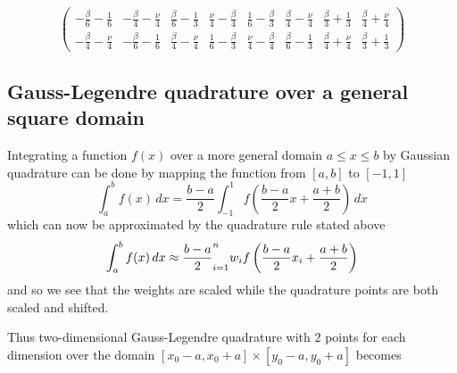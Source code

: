 \documentclass[11pt]{article}
\let\sumop\relax
\begin{document}
\begin{equation}
\begin{pmatrix}
	- \frac{\beta}{6} - \frac{1}{6} & - \frac{\beta}{4} - \frac{\nu}{4} & \frac{\beta}{6} - \frac{1}{3} &   \frac{\nu}{4} - \frac{\beta}{4} & \frac{1}{6} - \frac{\beta}{3} &   \frac{\beta}{4} - \frac{\nu}{4} & \frac{\beta}{3} + \frac{1}{3} &   \frac{\beta}{4} + \frac{\nu}{4} \\
	- \frac{\beta}{4} - \frac{\nu}{4} &  - \frac{\beta}{6} - \frac{1}{6} &   \frac{\beta}{4} - \frac{\nu}{4} & \frac{1}{6} - \frac{\beta}{3} &   \frac{\nu}{4} - \frac{\beta}{4} & \frac{\beta}{6} - \frac{1}{3} &   \frac{\beta}{4} + \frac{\nu}{4} & \frac{\beta}{3} + \frac{1}{3}
\end{pmatrix}
\end{equation}

\subsection{Gauss-Legendre quadrature over a general square domain}

Integrating a function $f(x)$ over a more general domain $a \le x \le b$ by Gaussian quadrature can be done by mapping the function from $[a,b]$ to $[-1,1]$
\begin{equation}
\int_a^b f(x) \, dx = \frac{b-a}{2} \int_{-1}^1 f\left(\frac{b-a}{2}x + \frac{a+b}{2}\right) \, dx
\end{equation}
which can now be approximated by the quadrature rule stated above
\begin{equation}
\int_a^b f(x) \, dx \approx \frac{b-a}{2} \sumop_{i=1}^n w_i f\left( \frac{b-a}{2}x_i + \frac{a+b}{2} \right)
\end{equation}
and so we see that the weights are scaled while the quadrature points are both scaled and shifted.

Thus two-dimensional Gauss-Legendre quadrature with 2 points for each dimension over the domain $[x_0-a,x_0+a]\times[y_0-a,y_0+a]$ becomes
\end{document}
